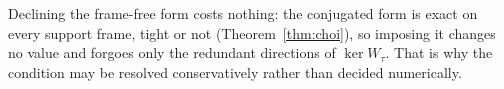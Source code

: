 \begin{remark}
Declining the frame-free form costs nothing: the conjugated form is exact
on every support frame, tight or not (Theorem~\ref{thm:choi}), so imposing
it changes no value and forgoes only the redundant directions of
$\ker W_{\tau}$. That is why the condition may be resolved conservatively
rather than decided numerically.
\end{remark}
